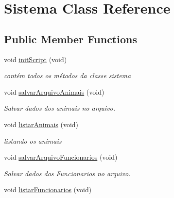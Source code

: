 \hypertarget{class_sistema}{}\section{Sistema Class Reference}
\label{class_sistema}
\subsection*{Public Member Functions}
\begin{DoxyCompactItemize}
\item 
\mbox{\label{class_sistema_a637f67c9c3d34e2686f09b1644bd6709}} 
void \mbox{\hyperlink{class_sistema_a637f67c9c3d34e2686f09b1644bd6709}{init\+Script}} (void)
\begin{DoxyCompactList}\small\item\em contém todos os métodos da classe sistema \end{DoxyCompactList}\item 
\mbox{\label{class_sistema_a959b36315fae7423cadd7c1a110efe9f}} 
void \mbox{\hyperlink{class_sistema_a959b36315fae7423cadd7c1a110efe9f}{salvar\+Arquivo\+Animais}} (void)
\begin{DoxyCompactList}\small\item\em Salvar dados dos animais no arquivo. \end{DoxyCompactList}\item 
void \mbox{\hyperlink{class_sistema_a1296c9bb67a554963f550b5a4d1dec40}{listar\+Animais}} (void)
\begin{DoxyCompactList}\small\item\em listando os animais \end{DoxyCompactList}\item 
\mbox{\label{class_sistema_a4f3b270ace3e06dc319b23ef01961cb1}} 
void \mbox{\hyperlink{class_sistema_a4f3b270ace3e06dc319b23ef01961cb1}{salvar\+Arquivo\+Funcionarios}} (void)
\begin{DoxyCompactList}\small\item\em Salvar dados dos Funcionarios no arquivo. \end{DoxyCompactList}\item 
\mbox{\label{class_sistema_a2ef640ae75525dc0ac48878a66e1822d}} 
void \mbox{\hyperlink{class_sistema_a2ef640ae75525dc0ac48878a66e1822d}{listar\+Funcionarios}} (void)

\end{DoxyCompactItemize}
